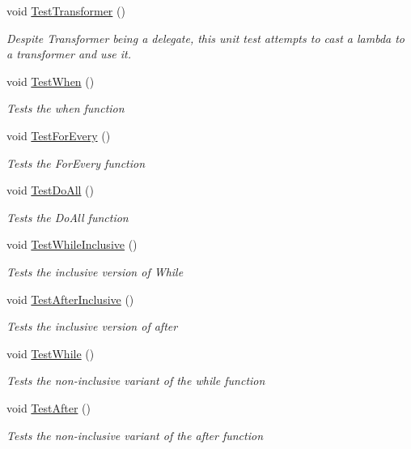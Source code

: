 \begin{DoxyCompactItemize}
\item 
void \hyperlink{classHumDrumTests_1_1Collections_1_1HigherOrder_a09af15fa7e15d1ae88a4a7718465654b}{Test\+Transformer} ()
\begin{DoxyCompactList}\small\item\em Despite Transformer being a delegate, this unit test attempts to cast a lambda to a transformer and use it. \end{DoxyCompactList}\item 
void \hyperlink{classHumDrumTests_1_1Collections_1_1HigherOrder_a35e3afe33158ce1accc409bc869216a7}{Test\+When} ()
\begin{DoxyCompactList}\small\item\em Tests the when function \end{DoxyCompactList}\item 
void \hyperlink{classHumDrumTests_1_1Collections_1_1HigherOrder_a519e1c69f362f59539ae3eaa4869c0cb}{Test\+For\+Every} ()
\begin{DoxyCompactList}\small\item\em Tests the For\+Every function \end{DoxyCompactList}\item 
void \hyperlink{classHumDrumTests_1_1Collections_1_1HigherOrder_ac3555e9c4aec3e6aa8de2e95d929f502}{Test\+Do\+All} ()
\begin{DoxyCompactList}\small\item\em Tests the Do\+All function \end{DoxyCompactList}\item 
void \hyperlink{classHumDrumTests_1_1Collections_1_1HigherOrder_a9de424bcbef678ad1207d2a4000bb760}{Test\+While\+Inclusive} ()
\begin{DoxyCompactList}\small\item\em Tests the inclusive version of While \end{DoxyCompactList}\item 
void \hyperlink{classHumDrumTests_1_1Collections_1_1HigherOrder_aa93ecf5ef2d168796281d23c624bbbb3}{Test\+After\+Inclusive} ()
\begin{DoxyCompactList}\small\item\em Tests the inclusive version of after \end{DoxyCompactList}\item 
void \hyperlink{classHumDrumTests_1_1Collections_1_1HigherOrder_acf788d703a1f4a724bd369e00f883620}{Test\+While} ()
\begin{DoxyCompactList}\small\item\em Tests the non-\/inclusive variant of the while function \end{DoxyCompactList}\item 
void \hyperlink{classHumDrumTests_1_1Collections_1_1HigherOrder_a447ff32521dd1e559dab255b75079804}{Test\+After} ()
\begin{DoxyCompactList}\small\item\em Tests the non-\/inclusive variant of the after function \end{DoxyCompactList}\end{DoxyCompactItemize}


